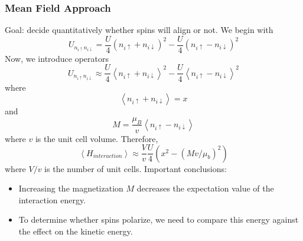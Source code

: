 \documentclass[10pt]{article}
\begin{document}
\subsubsection{Mean Field Approach}
Goal: decide quantitatively whether spins will align or not. We begin with
$$
U_{n_{i\uparrow}n_{i\downarrow}} = \frac{U}{4}(n_{i\uparrow} + n_{i\downarrow})^{2} - \frac{U}{4}(n_{i\uparrow} - n_{i\downarrow})^{2}
$$
Now, we introduce operators
$$
U_{n_{i\uparrow}n_{i\downarrow}} \approx \frac{U}{4} \left < n_{i\uparrow} + n_{i\downarrow}\right >^{2} - \frac{U}{4}\left <n_{i\uparrow} - n_{i\downarrow}\right >^{2}
$$
where
$$
\left < n_{i\uparrow} + n_{i\downarrow}\right > = x
$$
and
$$
M = \frac{\mu_{B}}{v}\left <n_{i\uparrow} - n_{i\downarrow}\right >
$$
where $v$ is the unit cell volume. Therefore,
$$
\left < H_{interaction}\right > \approx \frac{V}{v}\frac{U}{4}(x^{2} - (Mv/\mu_{b})^{2})
$$
where $V/v$ is the number of unit cells. Important conclusions:
\begin{itemize}
  \item Increasing the magnetization $M$ decreases the expectation value of the interaction energy.
  \item To determine whether spins polarize, we need to compare this energy against the effect on the kinetic energy.
\end{itemize}
\end{document}
